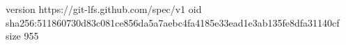 version https://git-lfs.github.com/spec/v1
oid sha256:511860730d83c081ce856da5a7aebc4fa4185e33ead1e3ab135fe8dfa31140cf
size 955
